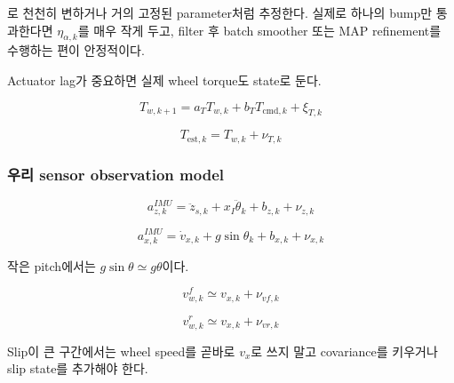 \documentclass[letterpaper,10pt,journal,twocolumn]{ieeeconf}
\begin{document}
로 천천히 변하거나 거의 고정된 parameter처럼 추정한다. 실제로 하나의 bump만 통과한다면 \(\eta_{\alpha,k}\)를 매우 작게 두고, filter 후 batch smoother 또는 MAP refinement를 수행하는 편이 안정적이다.

Actuator lag가 중요하면 실제 wheel torque도 state로 둔다.

\[
T_{w,k+1}
=
a_TT_{w,k}
+b_TT_{\mathrm{cmd},k}
+\xi_{T,k}
\]

\[
T_{\mathrm{est},k}
=
T_{w,k}+\nu_{T,k}
\]

\subsubsection{우리 sensor observation model}

\[
a_{z,k}^{IMU}
=
\ddot z_{s,k}
+x_I\ddot\theta_k
+b_{z,k}
+\nu_{z,k}
\]

\[
a_{x,k}^{IMU}
=
\dot v_{x,k}
+g\sin\theta_k
+b_{x,k}
+\nu_{x,k}
\]

작은 pitch에서는 \(g\sin\theta\simeq g\theta\)이다.

\[
v_{w,k}^{f}
\simeq
v_{x,k}+\nu_{vf,k}
\]

\[
v_{w,k}^{r}
\simeq
v_{x,k}+\nu_{vr,k}
\]

Slip이 큰 구간에서는 wheel speed를 곧바로 \(v_x\)로 쓰지 말고 covariance를 키우거나 slip state를 추가해야 한다.
\end{document}
